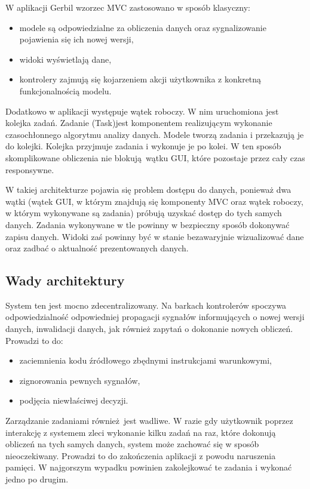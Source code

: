 W aplikacji Gerbil wzorzec MVC zastosowano w sposób klasyczny: 
\begin{itemize}
	\item modele są odpowiedzialne za obliczenia danych oraz sygnalizowanie pojawienia się ich nowej wersji,
	\item widoki wyświetlają dane,
	\item kontrolery zajmują się kojarzeniem akcji użytkownika z konkretną funkcjonalnością modelu.
\end{itemize}

Dodatkowo w aplikacji występuje wątek roboczy. W nim uruchomiona jest kolejka zadań. Zadanie (Task)jest komponentem realizującym wykonanie czasochłonnego algorytmu analizy danych. Modele tworzą zadania i przekazują je do kolejki. Kolejka przyjmuje zadania i wykonuje je po kolei. W ten sposób skomplikowane obliczenia nie blokują wątku GUI, które pozostaje przez cały czas responsywne.

W takiej architekturze pojawia się problem dostępu do danych, ponieważ dwa wątki (wątek GUI, w którym znajdują się komponenty MVC oraz wątek roboczy, w którym wykonywane są zadania) próbują uzyskać dostęp do tych samych danych. Zadania wykonywane w tle powinny w bezpieczny sposób dokonywać zapisu danych. Widoki zaś powinny być w stanie bezawaryjnie wizualizować dane oraz zadbać o aktualność prezentowanych danych.

\subsection{Wady architektury}

System ten jest mocno zdecentralizowany. Na barkach kontrolerów spoczywa odpowiedzialność odpowiedniej propagacji sygnałów informujących o nowej wersji danych, inwalidacji danych, jak również zapytań o dokonanie nowych obliczeń. Prowadzi to do:
\begin{itemize}
	\item zaciemnienia kodu źródłowego zbędnymi instrukcjami warunkowymi,
	\item zignorowania pewnych sygnałów,
	\item podjęcia niewłaściwej decyzji.
\end{itemize}

Zarządzanie zadaniami również jest wadliwe. W razie gdy użytkownik poprzez interakcję z systemem zleci wykonanie kilku zadań na raz, które dokonują obliczeń na tych samych danych, system może zachować się w sposób nieoczekiwany. Prowadzi to do zakończenia aplikacji z powodu naruszenia pamięci. W najgorszym wypadku powinien zakolejkować te zadania i wykonać jedno po drugim.

